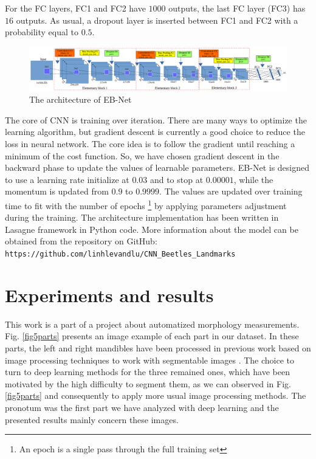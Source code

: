 \documentclass[review]{elsarticle}
\begin{document}
For the FC layers, FC1 and FC2 have $1000$ outputs, the last FC layer (FC3) has $16$ outputs. As usual, a dropout layer is inserted between FC1 and FC2 with a probability equal to $0.5$.

\begin{figure}[h]
	\centering
	\includegraphics[scale=0.3]{images/net3}
	\caption{The architecture of EB-Net}
	\label{fignet3}
\end{figure}

The core of CNN is training over iteration. There are many ways to optimize the learning algorithm, but gradient descent \cite{lecun2012efficient} is currently a good choice to reduce the loss in neural network. The core idea is to follow the gradient until reaching a minimum of the cost function. So, we have chosen gradient descent in the backward phase to update the values of learnable parameters. EB-Net is designed to use a learning rate initialize at $0.03$ and to stop at $0.00001$, while the momentum is updated from $0.9$ to $0.9999$. The values are updated over training time to fit with the number of epochs \footnote{An epoch is a single pass through the full training set} by applying parameters adjustment during the training. The architecture implementation has been written in Lasagne framework \cite{lasagne} in Python code. More information about the model can be obtained from the repository on GitHub: \texttt{https://github.com/linhlevandlu/CNN\_Beetles\_Landmarks}
\section{Experiments and results}
\label{sexperiments}
This work is a part of a project about automatized morphology measurements. Fig. \ref{fig5parts} presents an image example of each part in our dataset. In these parts, the left and right mandibles have been processed in previous work based on image processing techniques to work with segmentable images \cite{le2017maelab}. The choice to turn to deep learning methods for the three remained ones, which have been motivated by the high difficulty to segment them, as we can observed in Fig. \ref{fig5parts} and consequently to apply more usual image processing methods. The pronotum was the first part we have analyzed with deep learning and the presented results mainly concern these images.
\end{document}
